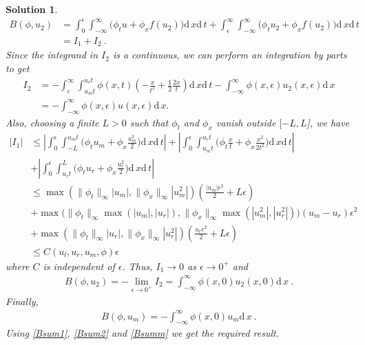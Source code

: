 \documentclass[10pt,letterpaper]{article}
\newcommand{\dif}[1][]{\mathrm{d} {#1}\,}
\newcommand{\frb}[1]{ \left(  {#1} \right) }
\theoremstyle{break}
\newtheorem{mysolution}{Solution}
\newtheorem*{mysolutioninformation}{Solution Information}
\newenvironment{solution}{\begin{mysolution}}{\end{mysolution}} \newenvironment{solutioninformation}{\begin{mysolutioninformation}}{\end{mysolutioninformation}}
\begin{document}
\begin{solution}
	\begin{align}
	B\frb{\phi,u_2} &=  \int_0^\epsilon \int_{-\infty}^\infty \Big(\phi_t u +\phi_x f\frb{u_2}\Big)\dif x\dif t +  \int_\epsilon^\infty \int_{-\infty}^\infty \Big(\phi_t u_2 +\phi_x f\frb{u_2}\Big)\dif x\dif t \\
	 & = I_1 + I_2 \ .
	\end{align}
	Since the integrand in $I_2$ is a continuous, we can perform an integration by parts to get
	\begin{align}
	I_2 &= - \int_\epsilon^\infty \int_{u_m t}^{u_r t} \phi(x,t) \left( - \frac{x}{t^2} + \frac{1}{2} \frac{2 x}{t} \right) \dif x \dif t - \int_{-\infty}^\infty \phi(x,\epsilon) u_2(x,\epsilon) \dif x  \\
		& = - \int_{-\infty}^\infty \phi(x,\epsilon) u(x,\epsilon) \dif x.
	\end{align}
	Also, choosing a finite $L>0$ such that $\phi_t$ and $\phi_x$ vanish outside $[-L,L$], we have
	\begin{align}
	|I_1| &\leq \left| \int_0^\epsilon \int_{-L}^{u_mt} \Big(\phi_t u_m +\phi_x \frac{u_m^2}{2}\Big)\dif x\dif t \right| + \left| \int_0^\epsilon \int_{u_mt}^{u_rt} \Big(\phi_t \frac{x}{t} +\phi_x \frac{x^2}{2t^2}\Big)\dif x\dif t \right|  \\
	&+ \left| \int_0^\epsilon \int_{u_rt}^L \Big(\phi_t u_r +\phi_x \frac{u_r^2}{2}\Big)\dif x\dif t \right| \\
	&\leq \max{(\|\phi_t\|_\infty|u_m|,\|\phi_x\|_\infty|u_m^2|)} \left( \frac{|u_m| \epsilon^2}{2} + L \epsilon \right) \\
	& + \max{\big(\|\phi_t\|_\infty \max(|u_m|,|u_r|),\|\phi_x\|_\infty \max(|u_m^2|,|u_r^2|)\big)} (u_m - u_r) \epsilon^2 \\
	& + \max{(\|\phi_t\|_\infty|u_r|,\|\phi_x\|_\infty|u_r^2|)} \left( \frac{u_r \epsilon^2}{2} + L \epsilon \right) \\
	& \leq C(u_l,u_r, u_m, \phi) \epsilon
	\end{align}
	where $C$ is independent of $\epsilon$. Thus, $I_1 \rightarrow 0$ as $\epsilon \rightarrow 0^+$ and
	\begin{gather} \label{Bsum2}
		B\frb{\phi,u_2}= - \lim \limits_{\epsilon \rightarrow 0^+} I_2 = \int_{-\infty}^{\infty} \phi(x,0) u_2(x,0) \dif x\ .
	\end{gather}
	Finally, 
	\begin{gather} \label{Bsumm}
		B\frb{\phi,u_m}= - \int_{-\infty}^{\infty} \phi(x,0) u_m \dif x\ .
	\end{gather}
	Using \eqref{Bsum1}, \eqref{Bsum2} and \eqref{Bsumm} we get the required result.
\end{solution}
\end{document}
